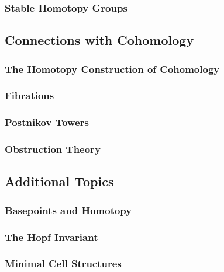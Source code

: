 \documentclass[11pt, a4paper]{article}
\begin{document}
\subsubsection{Stable Homotopy Groups}

\subsection{Connections with Cohomology}

\subsubsection{The Homotopy Construction of Cohomology}

\subsubsection{Fibrations}

\subsubsection{Postnikov Towers}

\subsubsection{Obstruction Theory}

\subsection*{Additional Topics}

\subsubsection{Basepoints and Homotopy}

\subsubsection{The Hopf Invariant}

\subsubsection{Minimal Cell Structures}
\end{document}
